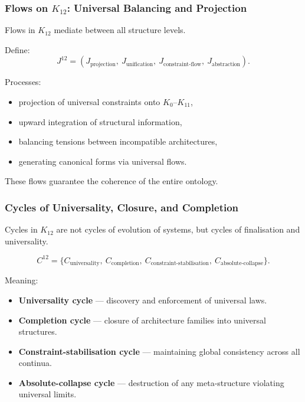 \subsubsection{Flows on $K_{12}$: Universal Balancing and Projection}

Flows in $K_{12}$ mediate between all structure levels.

Define:
\[
J^{12} = 
(J_{\text{projection}},\ J_{\text{unification}},\ 
 J_{\text{constraint-flow}},\ J_{\text{abstraction}}).
\]

Processes:
\begin{itemize}
    \item projection of universal constraints onto $K_0$--$K_{11}$,
    \item upward integration of structural information,
    \item balancing tensions between incompatible architectures,
    \item generating canonical forms via universal flows.
\end{itemize}

These flows guarantee the coherence of the entire ontology.

\subsubsection{Cycles of Universality, Closure, and Completion}

Cycles in $K_{12}$ are not cycles of evolution of systems,
but cycles of finalisation and universality.

\[
C^{12} = \{
C_{\text{universality}},\
C_{\text{completion}},\
C_{\text{constraint-stabilisation}},\
C_{\text{absolute-collapse}}
\}.
\]

Meaning:
\begin{itemize}
    \item \textbf{Universality cycle}  
      — discovery and enforcement of universal laws.

    \item \textbf{Completion cycle}  
      — closure of architecture families into universal structures.

    \item \textbf{Constraint-stabilisation cycle}  
      — maintaining global consistency across all continua.

    \item \textbf{Absolute-collapse cycle}  
      — destruction of any meta-structure violating universal limits.
\end{itemize}

